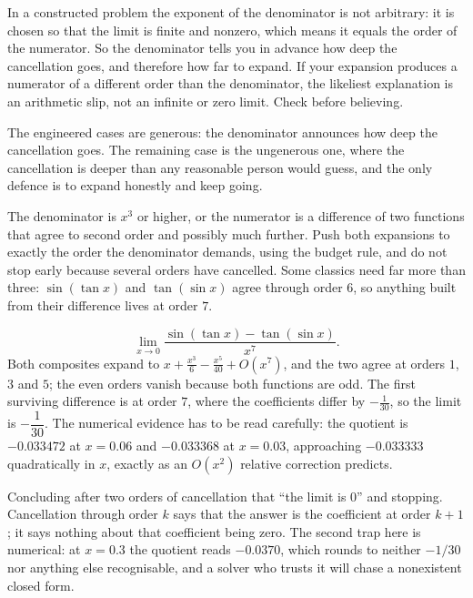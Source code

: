 \begin{keynote}
In a constructed problem the exponent of the denominator is not arbitrary: it is chosen so that the limit is finite and nonzero, which means it equals the order of the numerator. So the denominator tells you in advance how deep the cancellation goes, and therefore how far to expand. If your expansion produces a numerator of a different order than the denominator, the likeliest explanation is an arithmetic slip, not an infinite or zero limit. Check before believing.
\end{keynote}

The engineered cases are generous: the denominator announces how deep the cancellation goes. The remaining case is the ungenerous one, where the cancellation is deeper than any reasonable person would guess, and the only defence is to expand honestly and keep going.

\cue The denominator is $x^{3}$ or higher, or the numerator is a difference of two functions that agree to second order and possibly much further.
\method Push both expansions to exactly the order the denominator demands, using the budget rule, and do not stop early because several orders have cancelled. Some classics need far more than three: $\sin(\tan x)$ and $\tan(\sin x)$ agree through order $6$, so anything built from their difference lives at order $7$.

\begin{worked}
\[
\lim_{x\to0}\frac{\sin(\tan x)-\tan(\sin x)}{x^{7}}.
\]
Both composites expand to $x+\tfrac{x^{3}}{6}-\tfrac{x^{5}}{40}+O(x^{7})$, and the two agree at orders $1$, $3$ and $5$; the even orders vanish because both functions are odd. The first surviving difference is at order $7$, where the coefficients differ by $-\tfrac1{30}$, so the limit is $-\dfrac1{30}$. The numerical evidence has to be read carefully: the quotient is $-0.033472$ at $x=0.06$ and $-0.033368$ at $x=0.03$, approaching $-0.033333$ quadratically in $x$, exactly as an $O(x^{2})$ relative correction predicts.
\end{worked}

\begin{trap}
Concluding after two orders of cancellation that ``the limit is $0$'' and stopping. Cancellation through order $k$ says that the answer is the coefficient at order $k+1$; it says nothing about that coefficient being zero. The second trap here is numerical: at $x=0.3$ the quotient reads $-0.0370$, which rounds to neither $-1/30$ nor anything else recognisable, and a solver who trusts it will chase a nonexistent closed form.
\end{trap}

